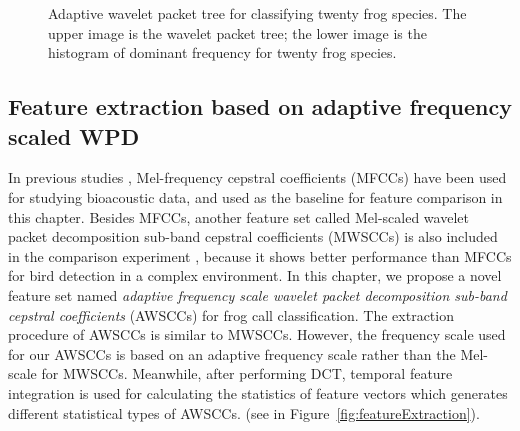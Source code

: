 \begin{figure}[htb!] %
\caption[Adaptive wavelet packet tree for classifying twenty frog species]{Adaptive wavelet packet tree for classifying twenty frog species. The upper image is the wavelet packet tree; the lower image is the histogram of dominant frequency for twenty frog species.}
\label{fig:tree20} 
\end{figure}



\subsection{Feature extraction based on adaptive frequency scaled WPD}

In previous studies \citep{bedoya2014automatic, Xie1504:Acoustic}, Mel-frequency cepstral coefficients (MFCCs) have been used for studying bioacoustic data, and used as the baseline for feature comparison in this chapter. Besides MFCCs, another feature set called Mel-scaled wavelet packet decomposition sub-band cepstral coefficients (MWSCCs) is also included in the comparison experiment \citep{Zhang2015108}, because it shows better performance than MFCCs for bird detection in a complex environment. In this chapter, we propose a novel feature set named \textit{adaptive frequency scale wavelet packet decomposition sub-band cepstral coefficients} (AWSCCs) for frog call classification.
The extraction procedure of AWSCCs is similar to MWSCCs. However, the frequency scale used for our AWSCCs is based on an adaptive frequency scale rather than the Mel-scale for MWSCCs. Meanwhile, after performing DCT, temporal feature integration is used for calculating the statistics of feature vectors which generates different statistical types of AWSCCs. (see in Figure~\ref{fig:featureExtraction}). 


